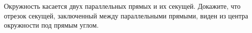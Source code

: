 \begin{ex}
	\begin{condition}
		Окружность касается двух параллельных прямых и их секущей. Докажите, что отрезок секущей, заключенный между параллельными прямыми, виден из центра окружности под прямым углом.
	\end{condition}
\end{ex}
